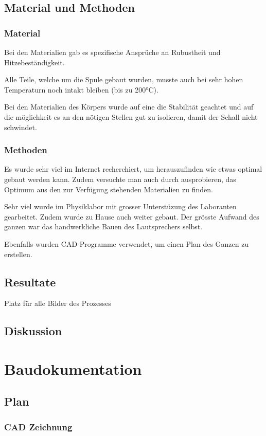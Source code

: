 \documentclass[a4paper,11pt]{report}
\begin{document}
\chapter{Material und Methoden}
\section{Material}
Bei den Materialien gab es spezifische Ansprüche an Rubustheit und Hitzebeständigkeit.

Alle Teile, welche um die Spule gebaut wurden, musste auch bei sehr hohen Temperaturn noch intakt bleiben (bis zu 200°C).

Bei den Materialien des Körpers wurde auf eine die Stabilität geachtet und auf die möglichkeit es an den nötigen Stellen gut zu isolieren, damit der Schall nicht schwindet.
\section{Methoden}
Es wurde sehr viel im Internet recherchiert, um herauszufinden wie etwas optimal gebaut werden kann. Zudem versuchte man auch durch ausprobieren, das Optimum aus den zur Verfügung stehenden Materialien zu finden.

Sehr viel wurde im Physiklabor mit grosser Unterstüzung des Laboranten gearbeitet. Zudem wurde zu Hause auch weiter gebaut. Der grösste Aufwand des ganzen war das handwerkliche Bauen des Lautsprechers selbst.

Ebenfalls wurden CAD Programme verwendet, um einen Plan des Ganzen zu erstellen.
\chapter{Resultate}

Platz für alle Bilder des Prozesses

\chapter{Diskussion}

\part{Baudokumentation}

\chapter{Plan}
\section{CAD Zeichnung}
\end{document}
